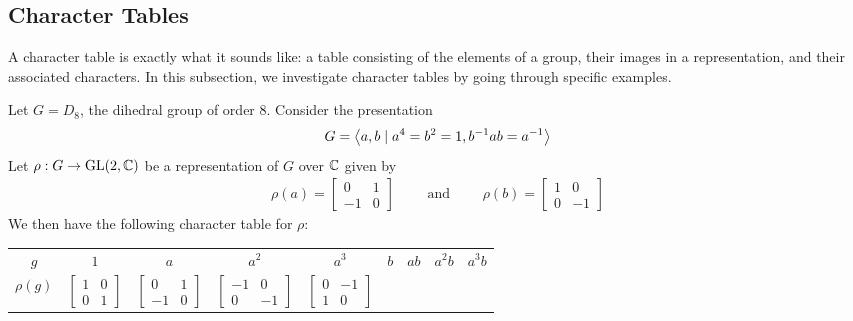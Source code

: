 \subsection{Character Tables}

A character table is exactly what it sounds like: a table consisting of the elements of a group, their images in a representation, and their associated characters. In this subsection, we investigate character tables by going through specific examples.

\begin{example}
    Let $G = D_8$, the dihedral group of order $8$. Consider the presentation
    \begin{align*}
        G = \left\langle a, b \mid a^4 = b^2 = 1, b^{-1} a b = a^{-1} \right\rangle
    \end{align*}
    Let $\rho : G \to \operatorname{GL}\!\left( 2, \mathbb{C} \right)$ be a representation of $G$ over $\mathbb{C}$ given by
    \begin{align*}
        \rho(a) = \begin{bmatrix}
            0 & 1 \\ -1 & 0
        \end{bmatrix}
        \quad\quad \text{ and } \quad\quad
        \rho(b) = \begin{bmatrix}
            1 & 0 \\ 0 & -1
        \end{bmatrix}
    \end{align*}
    We then have the following character table for $\rho$:
    \begin{table}[H]
        \centering
        \begin{tabular}{|c|cccccccc|}
            \hline
            $g$ & $1$ & $a$ & $a^2$ & $a^3$ & $b$ & $ab$ & $a^2 b$ & $a^3 b$ \\
            $\rho(g)$ &
            $\begin{bmatrix} 1 & 0 \\ 0 & 1 \end{bmatrix}$
            &
            $\begin{bmatrix} 0 & 1 \\ -1 & 0 \end{bmatrix}$
            &
            $\begin{bmatrix} -1 & 0 \\ 0 & -1 \end{bmatrix}$
            &
            $\begin{bmatrix} 0 & -1 \\ 1 & 0 \end{bmatrix}$

\end{tabular}
\end{table}
\end{example}
